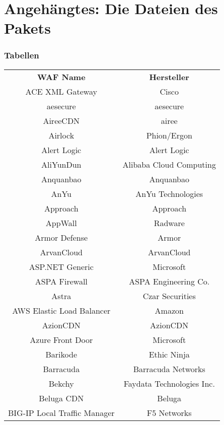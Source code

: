 

\chapter{Angehängtes: Die Dateien des Pakets}

\subsection*{Tabellen}

\begin{table}[h]
    \centering
    \begin{tabular}{|c | c |} 
 \hline
      \textbf{WAF Name} & \textbf{Hersteller}  \\
      ACE XML Gateway & Cisco \\
      aesecure & aesecure\\
      AireeCDN & airee \\
      Airlock & Phion/Ergon \\
      Alert Logic & Alert Logic \\
      AliYunDun & Alibaba Cloud Computing \\
      Anquanbao & Anquanbao \\
      AnYu & AnYu Technologies \\
      Approach & Approach \\
      AppWall & Radware \\
      Armor Defense & Armor \\
      ArvanCloud & ArvanCloud \\
      ASP.NET Generic & Microsoft \\
      ASPA Firewall & ASPA Engineering Co. \\
      Astra & Czar Securities \\
      AWS Elastic Load Balancer & Amazon \\
      AzionCDN & AzionCDN \\
      Azure Front Door & Microsoft \\
      Barikode & Ethic Ninja \\
      Barracuda & Barracuda Networks \\
      Bekchy & Faydata Technologies Inc.\\
      Beluga CDN & Beluga\\
      BIG-IP Local Traffic Manager & F5 Networks\\

\end{tabular}
\end{table}
